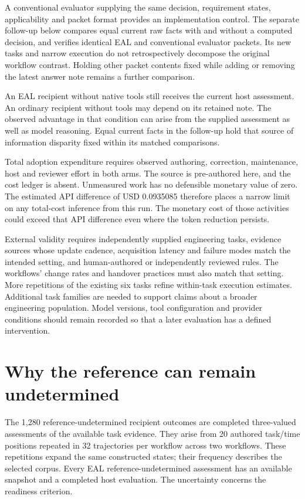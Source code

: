\documentclass[
  11pt,
]{article}
\begin{document}
A conventional evaluator supplying the same decision, requirement
states, applicability and packet format provides an implementation
control. The separate follow-up below compares equal current raw facts
with and without a computed decision, and verifies identical EAL and
conventional evaluator packets. Its new tasks and narrow execution do
not retrospectively decompose the original workflow contrast. Holding
other packet contents fixed while adding or removing the latest answer
note remains a further comparison.

An EAL recipient without native tools still receives the current host
assessment. An ordinary recipient without tools may depend on its
retained note. The observed advantage in that condition can arise from
the supplied assessment as well as model reasoning. Equal current facts
in the follow-up hold that source of information disparity fixed within
its matched comparisons.

Total adoption expenditure requires observed authoring, correction,
maintenance, host and reviewer effort in both arms. The source is
pre-authored here, and the cost ledger is absent. Unmeasured work has no
defensible monetary value of zero. The estimated API difference of USD
0.0935085 therefore places a narrow limit on any total-cost inference
from this run. The monetary cost of those activities could exceed that
API difference even where the token reduction persists.

External validity requires independently supplied engineering tasks,
evidence sources whose update cadence, acquisition latency and failure
modes match the intended setting, and human-authored or independently
reviewed rules. The workflows' change rates and handover practices must
also match that setting. More repetitions of the existing six tasks
refine within-task execution estimates. Additional task families are
needed to support claims about a broader engineering population. Model
versions, tool configuration and provider conditions should remain
recorded so that a later evaluation has a defined intervention.

\FloatBarrier

\hypertarget{why-the-reference-can-remain-undetermined}{%
\section{Why the reference can remain
undetermined}\label{why-the-reference-can-remain-undetermined}}

The 1,280 reference-undetermined recipient outcomes are completed
three-valued assessments of the available task evidence. They arise from
20 authored task/time positions repeated in 32 trajectories per workflow
across two workflows. These repetitions expand the same constructed
states; their frequency describes the selected corpus. Every EAL
reference-undetermined assessment has an available snapshot and a
completed host evaluation. The uncertainty concerns the readiness
criterion.
\end{document}
